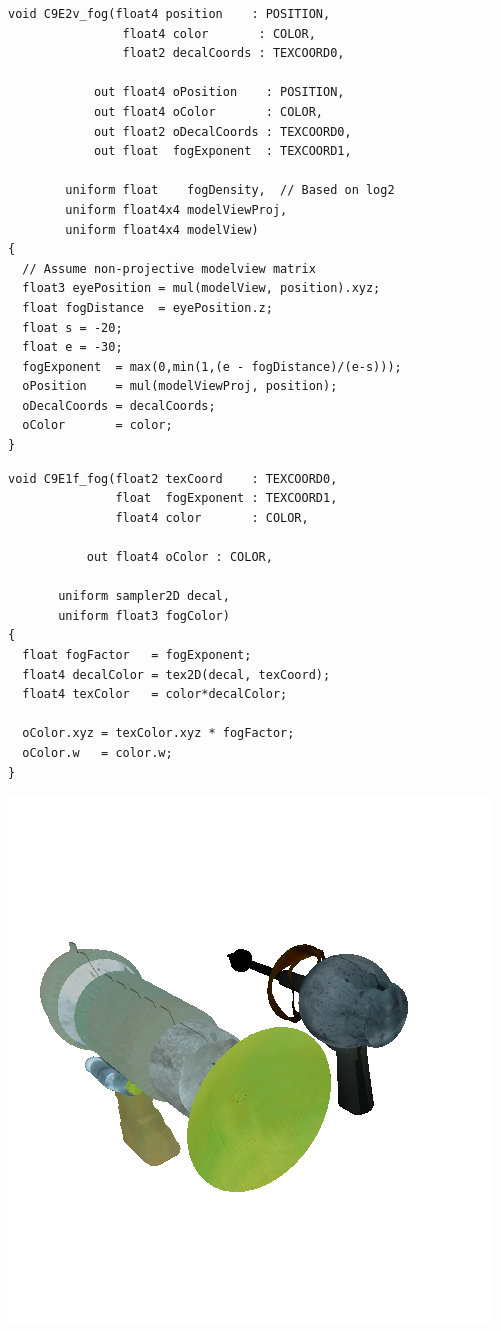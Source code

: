 \documentclass[letterpaper,11pt]{article}
\begin{document}
\begin{verbatim}
void C9E2v_fog(float4 position    : POSITION,
                float4 color       : COLOR,
                float2 decalCoords : TEXCOORD0,

            out float4 oPosition    : POSITION,
            out float4 oColor       : COLOR,
            out float2 oDecalCoords : TEXCOORD0,
            out float  fogExponent  : TEXCOORD1,

        uniform float    fogDensity,  // Based on log2
        uniform float4x4 modelViewProj,
        uniform float4x4 modelView)
{	
  // Assume non-projective modelview matrix
  float3 eyePosition = mul(modelView, position).xyz;
  float fogDistance  = eyePosition.z;
  float s = -20;
  float e = -30;
  fogExponent  = max(0,min(1,(e - fogDistance)/(e-s)));
  oPosition    = mul(modelViewProj, position);
  oDecalCoords = decalCoords;
  oColor       = color;
}
\end{verbatim}

\begin{verbatim}
void C9E1f_fog(float2 texCoord    : TEXCOORD0,
               float  fogExponent : TEXCOORD1,
               float4 color       : COLOR,

           out float4 oColor : COLOR,

       uniform sampler2D decal,
       uniform float3 fogColor)
{
  float fogFactor   = fogExponent;
  float4 decalColor = tex2D(decal, texCoord);
  float4 texColor   = color*decalColor;

  oColor.xyz = texColor.xyz * fogFactor;
  oColor.w   = color.w;
}
\end{verbatim}

\includegraphics[scale = .6]{HW3_3.png}
\end{document}
